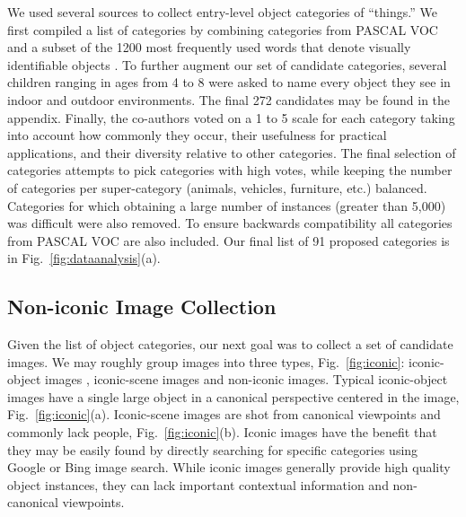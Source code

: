 We used several sources to collect entry-level object categories of ``things.'' We first compiled a list of categories by combining categories from PASCAL VOC \cite{PASCAL} and a subset of the 1200 most frequently used words that denote visually identifiable objects \cite{wordbank}. To further augment our set of candidate categories, several children ranging in ages from 4 to 8 were asked to name every object they see in indoor and outdoor environments. The final 272 candidates may be found in the appendix. Finally, the co-authors voted on a 1 to 5 scale for each category taking into account how commonly they occur, their usefulness for practical applications, and their diversity relative to other categories. The final selection of categories attempts to pick categories with high votes, while keeping the number of categories per super-category (animals, vehicles, furniture, etc.) balanced. Categories for which obtaining a large number of instances (greater than 5,000) was difficult were also removed. To ensure backwards compatibility all categories from PASCAL VOC \cite{PASCAL} are also included. Our final list of 91 proposed categories is in Fig.~\ref{fig:dataanalysis}(a).

\subsection{Non-iconic Image Collection} Given the list of object categories, our next goal was to collect a set of candidate images. We may roughly group images into three types, Fig.~\ref{fig:iconic}: iconic-object images \cite{berg2009finding}, iconic-scene images \cite{SUN} and non-iconic images. Typical iconic-object images have a single large object in a canonical perspective centered in the image, Fig.~\ref{fig:iconic}(a). Iconic-scene images are shot from canonical viewpoints and commonly lack people, Fig.~\ref{fig:iconic}(b). Iconic images have the benefit that they may be easily found by directly searching for specific categories using Google or Bing image search. While iconic images generally provide high quality object instances, they can lack important contextual information and non-canonical viewpoints.

